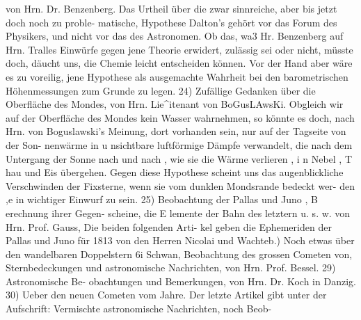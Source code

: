 \documentclass[12pt,a4paper]{article}
\begin{document}
von Hrn. Dr. Benzenberg. Das Urtheil über die zwar sinnreiche, aber bis jetzt doch noch zu proble-\newline
matische, Hypothese Dalton's gehört vor das Forum des Physikers, und nicht vor das des Astronomen.\newline
Ob das, wa3 Hr. Benzenberg auf Hrn. Tralles Einwürfe gegen jene Theorie erwidert, zulässig sei oder\newline
nicht, müsste doch, däucht uns, die Chemie leicht entscheiden können. Vor der Hand aber wäre es\newline
zu voreilig, jene Hypothese als ausgemachte Wahrheit bei den barometrischen Höhenmessungen zum\newline
Grunde zu legen. 24) Zufällige Gedanken über die Oberfläche des Mondes, von Hrn. Lie\^{}itenant von\newline
BoGusLAwsKi. Obgleich wir auf der Oberfläche des Mondes kein Wasser wahrnehmen, so könnte es\newline
doch, nach Hrn. von Boguslawski's Meinung, dort vorhanden sein, nur auf der Tagseite von der Son-\newline
nenwärme in u nsichtbare luftförmige Dämpfe verwandelt, die nach dem Untergang der Sonne nach und\newline
nach , wie sie die Wärme verlieren , i n Nebel , T hau und Eis übergehen. Gegen diese Hypothese scheint\newline
uns das augenblickliche Verschwinden der Fixsterne, wenn sie vom dunklen Mondsrande bedeckt wer-\newline
den ,e in wichtiger Einwurf zu sein. 25) Beobachtung der Pallas und Juno , B erechnung ihrer Gegen-\newline
scheine, die E lemente der Bahn des letztern u. s. w. von Hrn. Prof. Gauss, Die beiden folgenden Arti-\newline
kel geben die Ephemeriden der Pallas und Juno für 1813 von den Herren Nicolai und Wachteb.) Noch etwas über den wandelbaren Doppelstern 6i Schwan, Beobachtung des grossen Cometen von, Sternbedeckungen und astronomische Nachrichten, von Hrn. Prof. Bessel. 29) Astronomische Be-\newline
obachtungen und Bemerkungen, von Hrn. Dr. Koch in Danzig. 30) Ueber den neuen Cometen vom Jahre. Der letzte Artikel gibt unter der Aufschrift: Vermischte astronomische Nachrichten, noch Beob-\newline
\end{document}
